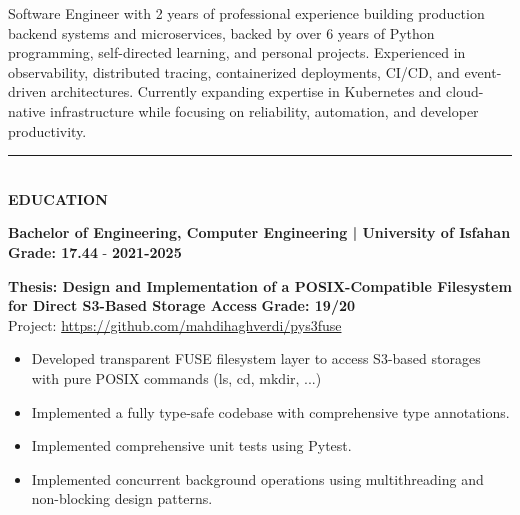 \documentclass[10pt, dvipsnames, svgnames, x11names]{article}
\begin{document}
\setlength{\baselineskip}{11pt}
\vspace{1mm}

 \vspace{0.8mm}

\vspace{0.8mm}

\noindent Software Engineer with 2 years of professional experience building production backend systems and microservices, backed by over 6 years of Python programming, self-directed learning, and personal projects. Experienced in observability, distributed tracing, containerized deployments, CI/CD, and event-driven architectures. Currently expanding expertise in Kubernetes and cloud-native infrastructure while focusing on reliability, automation, and developer productivity.

\noindent\textcolor{DarkBlue}{\rule{\textwidth}{0.05mm}} \vspace{-1mm} \\
{\LARGE \textbf{EDUCATION}}

\noindent \textbf{Bachelor of Engineering, Computer Engineering | University of Isfahan} \hfill \textbf{Grade: 17.44} - \textbf{2021-2025}

\noindent \textbf{Thesis: Design and Implementation of a POSIX-Compatible Filesystem for Direct S3-Based Storage Access} \hfill \textbf{Grade: 19/20} \\
Project: \href{https://github.com/mahdihaghverdi/pys3fuse}{https://github.com/mahdihaghverdi/pys3fuse}
\begin{itemize}[nosep]
\item Developed transparent FUSE filesystem layer to access S3-based storages with pure POSIX commands (ls, cd, mkdir, ...)
\item Implemented a fully type-safe codebase with comprehensive type annotations.
\item Implemented comprehensive unit tests using Pytest.
\item Implemented concurrent background operations using multithreading and non-blocking design patterns.
\end{itemize}
\end{document}
